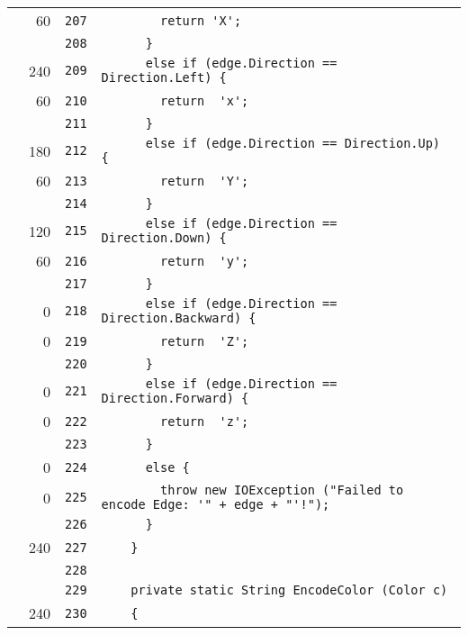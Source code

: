 \documentclass[a4paper,10pt]{article}
\begin{document}
\begin{longtable}[l]{lrrl}
\cellcolor{green} & 60 & \verb~207~ & \verb~        return 'X';~\\
\cellcolor{gray} &  & \verb~208~ & \verb~      }~\\
\cellcolor{green} & 240 & \verb~209~ & \verb~      else if (edge.Direction == Direction.Left) {~\\
\cellcolor{green} & 60 & \verb~210~ & \verb~        return  'x';~\\
\cellcolor{gray} &  & \verb~211~ & \verb~      }~\\
\cellcolor{green} & 180 & \verb~212~ & \verb~      else if (edge.Direction == Direction.Up) {~\\
\cellcolor{green} & 60 & \verb~213~ & \verb~        return  'Y';~\\
\cellcolor{gray} &  & \verb~214~ & \verb~      }~\\
\cellcolor{green} & 120 & \verb~215~ & \verb~      else if (edge.Direction == Direction.Down) {~\\
\cellcolor{green} & 60 & \verb~216~ & \verb~        return  'y';~\\
\cellcolor{gray} &  & \verb~217~ & \verb~      }~\\
\cellcolor{red} & 0 & \verb~218~ & \verb~      else if (edge.Direction == Direction.Backward) {~\\
\cellcolor{red} & 0 & \verb~219~ & \verb~        return  'Z';~\\
\cellcolor{gray} &  & \verb~220~ & \verb~      }~\\
\cellcolor{red} & 0 & \verb~221~ & \verb~      else if (edge.Direction == Direction.Forward) {~\\
\cellcolor{red} & 0 & \verb~222~ & \verb~        return  'z';~\\
\cellcolor{gray} &  & \verb~223~ & \verb~      }~\\
\cellcolor{red} & 0 & \verb~224~ & \verb~      else {~\\
\cellcolor{red} & 0 & \verb~225~ & \verb~        throw new IOException ("Failed to encode Edge: '" + edge + "'!");~\\
\cellcolor{gray} &  & \verb~226~ & \verb~      }~\\
\cellcolor{green} & 240 & \verb~227~ & \verb~    }~\\
\cellcolor{gray} &  & \verb~228~ & \verb~~\\
\cellcolor{gray} &  & \verb~229~ & \verb~    private static String EncodeColor (Color c)~\\
\cellcolor{green} & 240 & \verb~230~ & \verb~    {~\\

\end{longtable}
\end{document}
